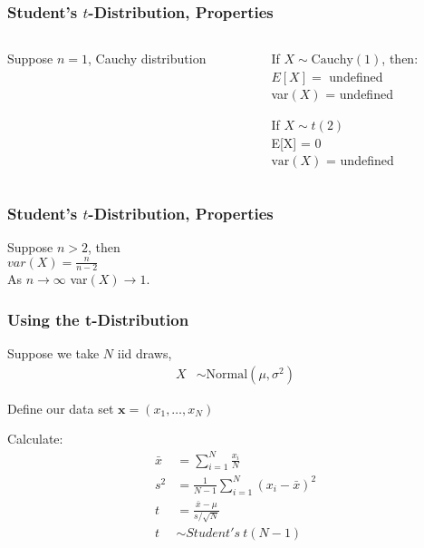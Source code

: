 \documentclass[aspectratio=169, handout]{beamer}
\numberwithin{equation}{section}
\begin{document}
\begin{frame}
\frametitle{Student's $t$-Distribution, Properties}
\begin{columns}
\begin{column}{0.5\textwidth}
Suppose $n = 1$, \alert{Cauchy} distribution

\end{column}
\begin{column}{0.5\textwidth}
If $X \sim \text{Cauchy}(1)$, then:\\\pause
$E[X] =$ undefined \\ \pause
var$(X)$ = undefined \\ \pause

If $X \sim t(2)$ \\ \pause
E[X] = 0  \\\pause
$\text{var}(X) $ = undefined
\end{column}
\end{columns}

\end{frame}


\begin{frame}
\frametitle{Student's $t$-Distribution, Properties}

Suppose $n>2$, then \\
$var(X) = \frac{n}{n-2}$ \\
As $n \rightarrow \infty$ var$(X) \rightarrow 1$.  



\end{frame}



\begin{frame}
\frametitle{Using the t-Distribution}
Suppose we take $N$ iid draws, 
\begin{align*}
X & \sim  \text{Normal}(\mu, \sigma^2) 
\end{align*}

Define our data set $\boldsymbol{x} = (x_{1}, \hdots, x_{N})$

Calculate:
\begin{align*}
 \bar{x} & =   \sum_{i=1}^{N} \frac{x_{i}}{N} \\
 s^2 & =  \frac{1}{N-1} \sum_{i=1}^{N} (x_{i} - \bar{x})^2\\
t & =  \frac{\bar{x} - \mu}{s/\sqrt{N}}  \\
t & \sim Student's\ t(N-1) 
\end{align*}
\end{frame}
\end{document}
